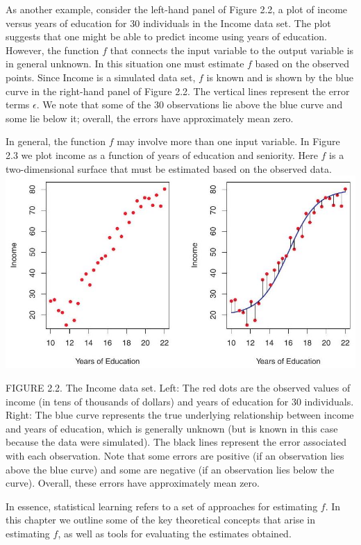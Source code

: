 \documentclass[10pt]{article}
\begin{document}
As another example, consider the left-hand panel of Figure 2.2, a plot of income versus years of education for 30 individuals in the Income data set. The plot suggests that one might be able to predict income using years of education. However, the function $f$ that connects the input variable to the output variable is in general unknown. In this situation one must estimate $f$ based on the observed points. Since Income is a simulated data set, $f$ is known and is shown by the blue curve in the right-hand panel of Figure 2.2. The vertical lines represent the error terms $\epsilon$. We note that some of the 30 observations lie above the blue curve and some lie below it; overall, the errors have approximately mean zero.

In general, the function $f$ may involve more than one input variable. In Figure 2.3 we plot income as a function of years of education and seniority. Here $f$ is a two-dimensional surface that must be estimated based on the observed data.\\
\includegraphics[max width=\textwidth, center]{2025_05_05_efe77898333945044de4g-032}

FIGURE 2.2. The Income data set. Left: The red dots are the observed values of income (in tens of thousands of dollars) and years of education for 30 individuals. Right: The blue curve represents the true underlying relationship between income and years of education, which is generally unknown (but is known in this case because the data were simulated). The black lines represent the error associated with each observation. Note that some errors are positive (if an observation lies above the blue curve) and some are negative (if an observation lies below the curve). Overall, these errors have approximately mean zero.

In essence, statistical learning refers to a set of approaches for estimating $f$. In this chapter we outline some of the key theoretical concepts that arise in estimating $f$, as well as tools for evaluating the estimates obtained.
\end{document}
